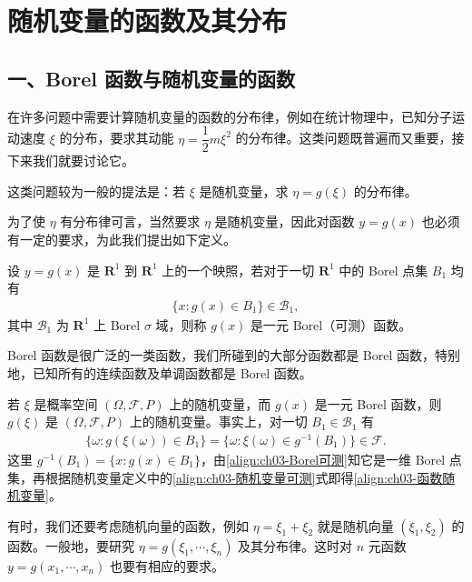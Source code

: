 \documentclass[../../main.tex]{subfiles}
\begin{document}
\section{随机变量的函数及其分布}\label{section:ch03-随机变量的函数及其分布}

\subsection*{一、Borel 函数与随机变量的函数}

在许多问题中需要计算随机变量的函数的分布律，例如在统计物理中，已知分子运动速度 $\xi$ 的分布，要求其动能 $\eta=\dfrac{1}{2}m\xi^{2}$ 的分布律。这类问题既普遍而又重要，接下来我们就要讨论它。

这类问题较为一般的提法是：若 $\xi$ 是随机变量，求 $\eta=g(\xi)$ 的分布律。

为了使 $\eta$ 有分布律可言，当然要求 $\eta$ 是随机变量，因此对函数 $y=g(x)$ 也必须有一定的要求，为此我们提出如下定义。

\begin{definition}\label{definition:ch03-Borel可测函数}
设 $y=g(x)$ 是 $\mathbf{R}^{1}$ 到 $\mathbf{R}^{1}$ 上的一个映照，若对于一切 $\mathbf{R}^{1}$ 中的 Borel 点集 $B_1$ 均有
\begin{align}
\{x:g(x)\in B_1\}\in\mathscr{B}_1,\label{align:ch03-Borel可测}
\end{align}
其中 $\mathscr{B}_1$ 为 $\mathbf{R}^{1}$ 上 Borel $\sigma$ 域，则称 $g(x)$ 是一元 Borel（可测）函数。
\end{definition}

Borel 函数是很广泛的一类函数，我们所碰到的大部分函数都是 Borel 函数，特别地，已知所有的连续函数及单调函数都是 Borel 函数。

若 $\xi$ 是概率空间 $(\Omega,\mathscr{F},P)$ 上的随机变量，而 $g(x)$ 是一元 Borel 函数，则 $g(\xi)$ 是 $(\Omega,\mathscr{F},P)$ 上的随机变量。事实上，对一切 $B_1\in\mathscr{B}_1$ 有
\begin{align}
\{\omega:g(\xi(\omega))\in B_1\}=\{\omega:\xi(\omega)\in g^{-1}(B_1)\}\in\mathscr{F}.\label{align:ch03-函数随机变量}
\end{align}
这里 $g^{-1}(B_1)=\{x:g(x)\in B_1\}$，由\eqref{align:ch03-Borel可测}知它是一维 Borel 点集，再根据随机变量定义中的\eqref{align:ch03-随机变量可测}式即得\eqref{align:ch03-函数随机变量}。

有时，我们还要考虑随机向量的函数，例如 $\eta=\xi_1+\xi_2$ 就是随机向量 $(\xi_1,\xi_2)$ 的函数。一般地，要研究 $\eta=g(\xi_1,\cdots,\xi_n)$ 及其分布律。这时对 $n$ 元函数 $y=g(x_1,\cdots,x_n)$ 也要有相应的要求。
\end{document}
